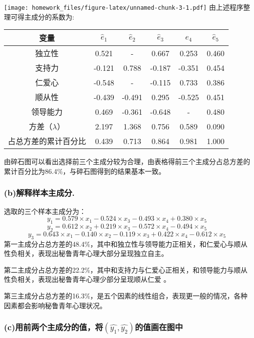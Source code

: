 \documentclass[
]{article}
\begin{document}
\texttt{[image: homework\_files/figure-latex/unnamed-chunk-3-1.pdf]}
由上述程序整理可得主成分的系数为:

\begin{longtable}[]{@{}cccccc@{}}
\toprule
变量 & \(\hat{e}_{1}\) & \(\hat{e}_{2}\) & \(\hat{e}_{3}\) & \(\hat{e}_{4}\) &
\(\hat{e}_{5}\)\tabularnewline
\midrule
\endhead
独立性 & 0.521 & - & 0.667 & 0.253 & 0.460\tabularnewline
支持力 & -0.121 & 0.788 & -0.187 & -0.351 & 0.454\tabularnewline
仁爱心 & -0.548 & - & -0.115 & 0.733 & 0.386\tabularnewline
顺从性 & -0.439 & -0.491 & 0.295 & -0.525 & 0.451\tabularnewline
领导能力 & 0.469 & -0.361 & -0.648 & - & 0.480\tabularnewline
方差（$\hat{\lambda}$） & 2.197 & 1.368 & 0.756 & 0.589 &
0.090\tabularnewline
占总方差的累计百分比 & 0.439 & 0.713 & 0.864 & 0.981 &
1.000\tabularnewline
\bottomrule
\end{longtable}

由碎石图可以看出选择前三个主成分较为合理，由表格得前三个主成分占总方差的累计百分比为86.4\%，与碎石图得到的结果基本一致。

\hypertarget{bux89e3ux91caux6837ux672cux4e3bux6210ux5206.}{%
\subsubsection{(b)解释样本主成分.}\label{bux89e3ux91caux6837ux672cux4e3bux6210ux5206.}}

选取的三个样本主成分为：
$$ 
y_{1}=0.579\times x_{1}-0.524\times x_{3}-0.493\times x_{4}+0.380\times x_{5}
$$
$$
y_{2}=0.612\times x_{2}+0.219\times x_{3}-0.572\times x_{4}-0.494\times x_{5}
$$
$$
y_{3}=0.643\times x_{1}-0.140\times x_{2}-0.119\times x_{3}+0.422\times x_{4}-0.612\times x_{5}
$$
第一主成分占总方差的48.4\%，其中和独立性与领导能力正相关，和仁爱心与顺从性负相关，表现出秘鲁青年心理大部分呈现独立自主。

第二主成分占总方差的22.2\%，其中和支持力与仁爱心正相关，和领导能力与顺从性负相关，表现出秘鲁青年心理少部分呈现顺从仁爱
。

第三主成分占总方差的16.3\%，是五个因素的线性组合，表现更一般的情况，各种因素都会影响秘鲁青年心理状况。

\hypertarget{cux7528ux524dux4e24ux4e2aux4e3bux6210ux5206ux7684ux503cux5c06y_1y_2ux7684ux503cux753bux5728ux56feux4e2d}{%
\subsubsection{\texorpdfstring{(c)用前两个主成分的值，将$(\hat{y_{1}},\hat{y_{2}})$的值画在图中}{(c)用前两个主成分的值，将(y\_\{1\},y\_\{2\})的值画在图中}}\label{cux7528ux524dux4e24ux4e2aux4e3bux6210ux5206ux7684ux503cux5c06y_1y_2ux7684ux503cux753bux5728ux56feux4e2d}}
\end{document}
